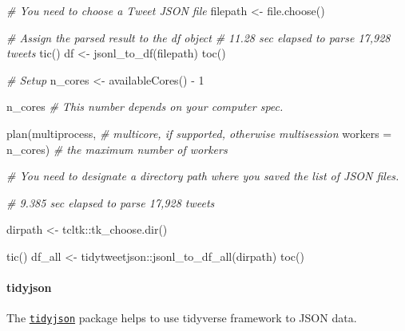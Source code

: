 \documentclass[
]{book}
\newenvironment{Shaded}{\begin{snugshade}}{\end{snugshade}}
\newcommand{\AttributeTok}[1]{\textcolor[rgb]{0.77,0.63,0.00}{#1}}
\newcommand{\CommentTok}[1]{\textcolor[rgb]{0.56,0.35,0.01}{\textit{#1}}}
\newcommand{\DecValTok}[1]{\textcolor[rgb]{0.00,0.00,0.81}{#1}}
\newcommand{\FunctionTok}[1]{\textcolor[rgb]{0.00,0.00,0.00}{#1}}
\newcommand{\NormalTok}[1]{#1}
\newcommand{\OtherTok}[1]{\textcolor[rgb]{0.56,0.35,0.01}{#1}}
\newcommand{\SpecialCharTok}[1]{\textcolor[rgb]{0.00,0.00,0.00}{#1}}
\begin{document}
\begin{Shaded}
\begin{Highlighting}[]
\CommentTok{\# You need to choose a Tweet JSON file}
\NormalTok{filepath }\OtherTok{\textless{}{-}} \FunctionTok{file.choose}\NormalTok{()}

\CommentTok{\# Assign the parsed result to the \textasciigrave{}df\textasciigrave{} object}
\CommentTok{\# 11.28 sec elapsed to parse 17,928 tweets }
\FunctionTok{tic}\NormalTok{()}
\NormalTok{df }\OtherTok{\textless{}{-}} \FunctionTok{jsonl\_to\_df}\NormalTok{(filepath)}
\FunctionTok{toc}\NormalTok{()}
\end{Highlighting}
\end{Shaded}

\begin{Shaded}
\begin{Highlighting}[]
\CommentTok{\# Setup }
\NormalTok{n\_cores }\OtherTok{\textless{}{-}} \FunctionTok{availableCores}\NormalTok{() }\SpecialCharTok{{-}} \DecValTok{1}

\NormalTok{n\_cores }\CommentTok{\# This number depends on your computer spec.}

\FunctionTok{plan}\NormalTok{(multiprocess, }\CommentTok{\# multicore, if supported, otherwise multisession}
     \AttributeTok{workers =}\NormalTok{ n\_cores) }\CommentTok{\# the maximum number of workers}

\CommentTok{\# You need to designate a directory path where you saved the list of JSON files.}

\CommentTok{\# 9.385 sec elapsed to parse 17,928 tweets }

\NormalTok{dirpath }\OtherTok{\textless{}{-}}\NormalTok{ tcltk}\SpecialCharTok{::}\FunctionTok{tk\_choose.dir}\NormalTok{()}

\FunctionTok{tic}\NormalTok{()}
\NormalTok{df\_all }\OtherTok{\textless{}{-}}\NormalTok{ tidytweetjson}\SpecialCharTok{::}\FunctionTok{jsonl\_to\_df\_all}\NormalTok{(dirpath)}
\FunctionTok{toc}\NormalTok{()}
\end{Highlighting}
\end{Shaded}

\hypertarget{tidyjson}{%
\paragraph{tidyjson}\label{tidyjson}}

The \href{https://cran.r-project.org/web/packages/tidyjson/vignettes/introduction-to-tidyjson.html}{\texttt{tidyjson}} package helps to use tidyverse framework to JSON data.
\end{document}
